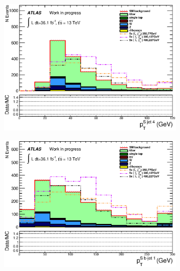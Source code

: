 \begin{figure}[h!]
  \begin{center}
    \begin{subfigure}[b]{0.40\textwidth}    
    	 \includegraphics[width=\textwidth]{figures/plotSR/SR_ND1_pTjV4_3SR.eps}
                \caption{ }
    \end{subfigure}
    \begin{subfigure}[b]{0.40\textwidth}    
    	 \includegraphics[width=\textwidth]{figures/plotSR/SR_ND1_pTbV1_3SR.eps}
                \caption{ }
    \end{subfigure}
    \begin{subfigure}[b]{0.40\textwidth}    

\end{subfigure}
\end{center}
\end{figure}
